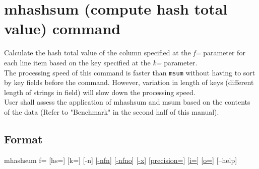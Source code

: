 \documentclass[a4paper]{jarticle}
\begin{document}
\renewcommand{\tablename}{Table }

\setlength{\baselineskip}{4mm}

\section*{mhashsum (compute hash total value) command}
Calculate the hash total value of the column specified at the \emph{f=} parameter for each line item based on the key specified at the \emph{k=} parameter. \\
The processing speed of this command is faster than \verb|msum| without having to sort by key fields before the command. However, variation in length of keys (different length of strings in field) will slow down the processing speed. \\
User shall assess the application of mhashsum and msum based on the contents of the data (Refer to "Benchmark" in the second half of this manual). \\

\subsection*{Format}
mhashsum f= [hs=] [k=] [-n] 
[\href{run:option.pdf}{-nfn}] 
[\href{run:option.pdf}{-nfno}] 
[\href{run:option.pdf}{-x}] 
[\href{run:option.pdf}{precision=}] 
[\href{run:option.pdf}{i=}] 
[\href{run:option.pdf}{o=}] 
[--help]\\
\end{document}
